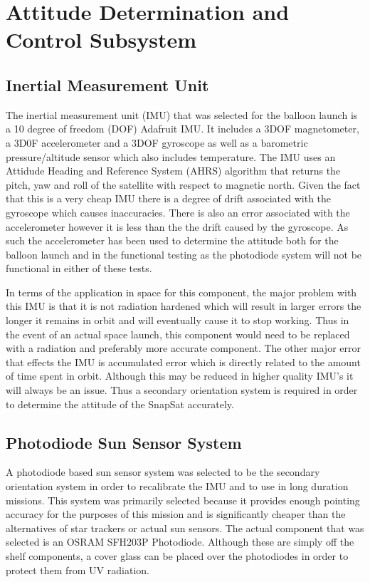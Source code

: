 \section{Attitude Determination and Control Subsystem}
\subsection{Inertial Measurement Unit}
The inertial measurement unit (IMU) that was selected for the balloon launch is a 10 degree of freedom (DOF) Adafruit IMU.  It includes a 3DOF magnetometer, a 3D0F accelerometer and a 3DOF gyroscope as well as a barometric pressure/altitude sensor which also includes temperature.  The IMU uses an Attidude Heading and Reference System (AHRS) algorithm that returns the pitch, yaw and roll of the satellite with respect to magnetic north.  Given the fact that this is a very cheap IMU there is a degree of drift associated with the gyroscope which causes inaccuracies.  There is also an error associated with the accelerometer however it is less than the the drift caused by the gyroscope. As such the accelerometer has been used to determine the attitude both for the balloon launch and in the functional testing as the photodiode system will not be functional in either of these tests.


In terms of the application in space for this component, the major problem with this IMU is that it is not radiation hardened which will result in larger errors the longer it remains in orbit and will eventually cause it to stop working.  Thus in the event of an actual space launch, this component would need to be replaced with a radiation and preferably more accurate component.  The other major error that effects the IMU is accumulated error which is directly related to the amount of time spent in orbit.  Although this may be reduced in higher quality IMU's it will always be an issue.  Thus a secondary orientation system is required in order to determine the attitude of the SnapSat accurately.

\subsection{Photodiode Sun Sensor System}
A photodiode based sun sensor system was selected to be the secondary orientation system in order to recalibrate the IMU and to use in long duration missions.  This system was primarily selected because it provides enough pointing accuracy for the purposes of this mission and is significantly cheaper than the alternatives of star trackers or actual sun sensors.  The actual component that was selected is an OSRAM SFH203P Photodiode.  Although these are simply off the shelf components, a cover glass can be placed over the photodiodes in order to protect them from UV radiation.



